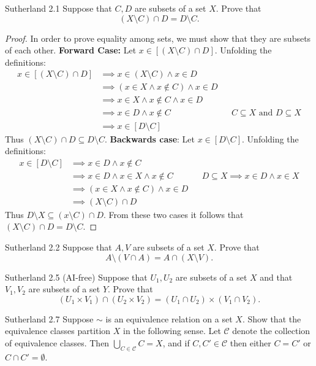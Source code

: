\documentclass{homework}
\begin{document}
\begin{problems}

\problem Sutherland 2.1
Suppose that $C, D$ are subsets of a set $X$. Prove that
\[
(X \setminus C) \cap D = D \setminus C.
\]
\solution
  \begin{proof}
$ $\newline In order to prove equality among sets, we must show that they are subsets of each other. 
    \textbf{Forward Case:} Let $x \in [(X \setminus C) \cap D]$. Unfolding the definitions:
    \begin{align*}
      x \in [( X \setminus C) \cap D] & \implies x \in (X \setminus C) \land x \in D \\
      & \implies (x \in X \land x \notin C) \land x \in D \\
      & \implies  x \in X \land x \notin C \land x \in D \\
      & \implies x \in D \land x \notin C && \text{$C \subseteq X$ and $D \subseteq X$}\\
      & \implies x \in [D \setminus C]
    \end{align*}
    Thus $(X \setminus C) \cap D \subseteq D \setminus C$. \newline
    \textbf{Backwards case}: Let $x \in [D \setminus C]$. Unfolding the definitions:
      \begin{align*}
        x \in [D \setminus C] &\implies x \in D \land x \notin C \\
        &\implies x \in D \land x \in X \land x \notin C && \text{$D \subseteq X \implies x \in D \land x \in X$}\\
        &\implies (x \in X \land x \notin C ) \land x \in D \\
        &\implies (X \setminus C) \cap D
      \end{align*}
      Thus $D \setminus X \subseteq (x \setminus C) \cap D$.
      From these two cases it follows that $(X \setminus C) \cap D = D \setminus C$.
\end{proof}

\problem Sutherland 2.2
Suppose that $A, V$ are subsets of a set $X$. Prove that
\[
A \setminus (V \cap A) = A \cap (X \setminus V).
\]
\solution

\problem Sutherland 2.5 (AI-free)
Suppose that $U_1, U_2$ are subsets of a set $X$ and that $V_1, V_2$ are
subsets of a set $Y$. Prove that
\[
(U_1 \times V_1) \cap (U_2 \times V_2) = (U_1 \cap U_2) \times (V_1 \cap V_2).
\]
\solution

\problem Sutherland 2.7
Suppose $\sim$ is an equivalence relation on a set $X$. Show that the equivalence classes partition
$X$ in the following sense. Let $\mathcal{C}$ denote the collection of equivalence classes. Then
$\bigcup_{C \in \mathcal{C}} C = X$, and if $C, C' \in \mathcal{C}$ then either $C = C'$ or
$C \cap C' = \emptyset$.
\solution


\end{problems}
\end{document}
